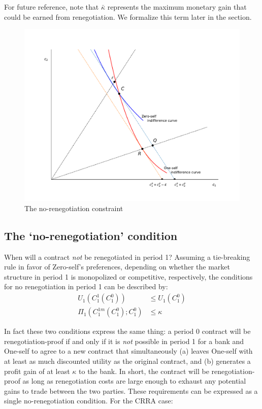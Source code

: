 \documentclass[11pt,english]{article}
\theoremstyle{plain}
\theoremstyle{definition}
\begin{document}
For future reference, note that $\bar{\kappa}$ represents the maximum monetary gain that could be earned from renegotiation. We formalize this term later in the section.

 
\begin{figure}[p]
\includegraphics[scale=0.7]{Figure2.pdf}\caption{The no-renegotiation constraint}
\label{fig:renegproof} 
\end{figure}


\subsection{The `no-renegotiation' condition}

\label{sec-no-reneg-cond}

When will a contract \textit{not} be renegotiated in period 1? Assuming
a tie-breaking rule in favor of Zero-self's preferences, depending
on whether the market structure in period 1 is monopolized or competitive,
respectively, the conditions for no renegotiation in period 1 can be described by:
\begin{align}
U_{1}\left(C_{1}^{1}\left(C_{1}^{0}\right)\right) & \leq U_{1}\left(C_{1}^{0}\right)\label{eq:no-reg-comp}\\
\Pi_{1}\left(C_{1}^{1m}\left(C_{1}^{0}\right);C_{1}^{0}\right) & \leq\kappa\label{eq:no-reg-monop}
\end{align}

In fact these two conditions express the same thing: a period 0 contract will be renegotiation-proof if and only if it is \textit{not} possible in period 1 for a bank and One-self to agree to a new contract that simultaneously (a) leaves One-self with at least as much discounted utility as the original contract, and (b) generates a profit gain of at least $\kappa$ to the bank. In short, the contract will be renegotiation-proof as long as renegotiation costs are large enough to exhaust any potential gains to trade between the two parties. These requirements can be expressed as a single no-renegotiation condition. For the CRRA case:
\end{document}
